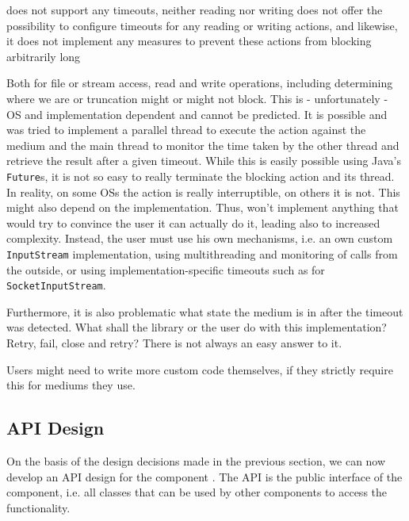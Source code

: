 {%
\LibName{} does not support any timeouts, neither reading nor writing
}
{%
\COMPmedia{} does not offer the possibility to configure timeouts for any reading or writing actions, and likewise, it does not implement any measures to prevent these actions from blocking arbitrarily long
}
{%
Both for file or stream access, read and write operations, including determining where we are or truncation might or might not block. This is - unfortunately - OS and implementation dependent and cannot be predicted. It is possible and was tried to implement a parallel thread to execute the action against the medium and the main thread to monitor the time taken by the other thread and retrieve the result after a given timeout. While this is easily possible using Java's \texttt{Future}s, it is not so easy to really terminate the blocking action and its thread. In reality, on some OSs the action is really interruptible, on others it is not. This might also depend on the implementation. Thus, \LibName{} won't implement anything that would try to convince the user it can actually do it, leading also to increased complexity. Instead, the user must use his own mechanisms, i.e. an own custom \texttt{InputStream} implementation, using multithreading and monitoring of calls from the outside, or using implementation-specific timeouts such as for \texttt{SocketInputStream}.

Furthermore, it is also problematic what state the medium is in after the timeout was detected. What shall the library or the user do with this implementation? Retry, fail, close and retry? There is not always an easy answer to it.
}
{%
Users might need to write more custom code themselves, if they strictly require this for mediums they use.
}


\subsection{API Design}
\label{sec:InterfaceDesignCOMPmedia}

On the basis of the design decisions made in the previous section, we can now develop an API design for the component \COMPmedia{}. The API is the public interface of the component, i.e. all classes that can be used by other components to access the \COMPmedia{} functionality.

